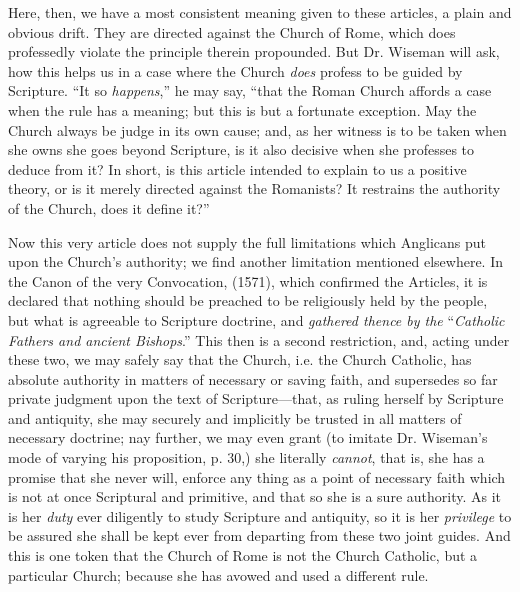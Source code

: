 Here, then,
we have a most consistent meaning given to these articles, a plain and
obvious drift. They are directed against the Church of Rome, which does
professedly violate the principle therein propounded. But Dr. Wiseman
will ask, how this helps us in a case where the Church \emph{does}
profess to be guided by Scripture. ``It so \emph{happens},'' he may
say, ``that the Roman Church affords a case when the rule has a
meaning; but this is but a fortunate exception. May the Church always be
judge in its own cause; and, as her witness is to be taken when she owns
she goes beyond Scripture, is it also decisive when she professes to
deduce from it? In short, is this article intended to explain to us a
positive theory, or is it merely directed against the Romanists? It
restrains the authority of the Church, does it define it?''

Now this
very article does not supply the full limitations which Anglicans put
upon the Church's authority; we find another limitation mentioned
elsewhere. In the Canon of the very Convocation, (1571), which confirmed
the Articles, it is declared that nothing should be preached to be
religiously held by the people, but what is agreeable to Scripture
doctrine, and \emph{gathered thence by the} ``\emph{Catholic Fathers and
ancient Bishops}.'' This then is a second restriction, and, acting
under these two, we may safely say that the Church, i.e. the Church
Catholic, has absolute authority in matters of necessary or saving
faith, and supersedes so far private judgment upon the text of
Scripture—that, as ruling herself by Scripture and antiquity, she may
securely and implicitly be trusted in all matters of necessary doctrine;
nay further, we may even grant (to imitate Dr. Wiseman's mode of
varying his proposition, p. 30,) she literally \emph{cannot}, that is,
she has a promise that she never will, enforce any thing as a point of
necessary faith which is not at once Scriptural and primitive, and that
so she is a sure authority. As it is her \emph{duty} ever diligently to
study Scripture and antiquity, so it is her \emph{privilege} to be
assured she shall be kept ever from departing from these two joint
guides. And this is one token that the Church of Rome is not the Church
Catholic, but a particular Church; because she has avowed and used a
different rule.

